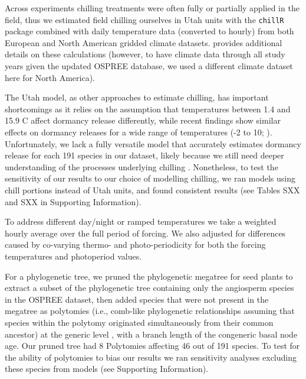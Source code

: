 \documentclass[11pt]{article}
\begin{document}
Across experiments chilling treatments were often fully or partially applied in the field, thus we estimated field chilling ourselves in Utah units with the \verb|chillR| package combined with daily temperature data (converted to hourly) from both European \citep[E-OBS, version 16, calculating the average of minimum and maximum daily temps,][]{cornes2018} and North American \citep[v3,][]{princetonclimate} gridded climate datasets. \citet{ettinger2020} provides additional details on these calculations (however, to have climate data through all study years given the updated OSPREE database, we used a different climate dataset here for North America).

The Utah model, as other approaches to estimate chilling, has important shortcomings as it relies on the assumption that temperatures between 1.4 and 15.9 \degree C affect dormancy release differently, while recent findings show similar effects on dormancy releases for a wide range of temperatures (-2 to 10\degreeC; \cite{baum2021}). Unfortunately, we lack a fully versatile model that accurately estimates dormancy release for each 191 species in our dataset, likely because we still need deeper understanding of the processes underlying chilling \citep{ettinger2020}. Nonetheless, to test the sensitivity of our results to our choice of modelling chilling, we ran models using chill portions instead of Utah units, and found consistent results (see Tables SXX and SXX in Supporting Information).%

To address different day/night or ramped temperatures we take a weighted hourly average over the full period of forcing. We also adjusted for differences caused by co-varying thermo- and photo-periodicity for both the forcing temperatures and photoperiod values.%


For a phylogenetic tree, we pruned  the phylogenetic megatree for seed plants \citep{smith2018constructing} to extract a subset of the phylogenetic tree containing only the angiosperm species in the OSPREE dataset, then added species that were not present in the megatree as polytomies (i.e., comb-like phylogenetic relationships assuming that species within the polytomy originated simultaneously from their common ancestor) at the generic level \citep[using the function `congeneric.merge' in][]{pearse2015pez}, with a branch length of the congeneric basal node age. Our pruned tree had 8 Polytomies affecting 46 out of 191 species. To test for the ability of polytomies to bias our results we ran sensitivity analyses excluding these species from models (see Supporting Information). \\ 
\end{document}
